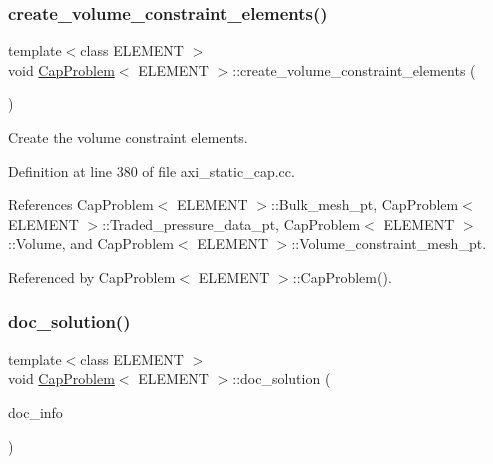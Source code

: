 \mbox{\label{classCapProblem_aa3a891fe6f5fc5fb5829e3bf636eda2c}} 
\subsubsection{\texorpdfstring{create\+\_\+volume\+\_\+constraint\+\_\+elements()}{create\_volume\_constraint\_elements()}}
{\footnotesize\ttfamily template$<$class E\+L\+E\+M\+E\+NT $>$ \\
void \hyperlink{classCapProblem}{Cap\+Problem}$<$ E\+L\+E\+M\+E\+NT $>$\+::create\+\_\+volume\+\_\+constraint\+\_\+elements (\begin{DoxyParamCaption}{ }\end{DoxyParamCaption})}



Create the volume constraint elements. 



Definition at line 380 of file axi\+\_\+static\+\_\+cap.\+cc.



References Cap\+Problem$<$ E\+L\+E\+M\+E\+N\+T $>$\+::\+Bulk\+\_\+mesh\+\_\+pt, Cap\+Problem$<$ E\+L\+E\+M\+E\+N\+T $>$\+::\+Traded\+\_\+pressure\+\_\+data\+\_\+pt, Cap\+Problem$<$ E\+L\+E\+M\+E\+N\+T $>$\+::\+Volume, and Cap\+Problem$<$ E\+L\+E\+M\+E\+N\+T $>$\+::\+Volume\+\_\+constraint\+\_\+mesh\+\_\+pt.



Referenced by Cap\+Problem$<$ E\+L\+E\+M\+E\+N\+T $>$\+::\+Cap\+Problem().

\mbox{\label{classCapProblem_a8549ca722d2d151ebf3ef7b35b925fbb}} 
\subsubsection{\texorpdfstring{doc\+\_\+solution()}{doc\_solution()}}
{\footnotesize\ttfamily template$<$class E\+L\+E\+M\+E\+NT $>$ \\
void \hyperlink{classCapProblem}{Cap\+Problem}$<$ E\+L\+E\+M\+E\+NT $>$\+::doc\+\_\+solution (\begin{DoxyParamCaption}\item[{Doc\+Info \&}]{doc\+\_\+info }\end{DoxyParamCaption})}



